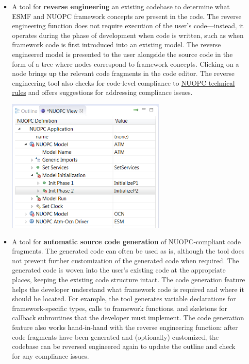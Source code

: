 \documentclass[oneside,11pt]{memoir}
\begin{document}
\begin{itemize}


\item
A tool for \textbf{reverse engineering} an existing codebase to determine what ESMF and NUOPC framework concepts are present in the code. The reverse engineering function does not require execution of the user's code---instead, it operates during the phase of development when code is written, such as when framework code is first introduced into an existing model. The reverse engineered model is presented to the user alongside the source code in the form of a tree where nodes correspond to framework concepts. Clicking on a node brings up the relevant code fragments in the code editor. The reverse engineering tool also checks for code-level compliance to \href{https://earthsystemcog.org/projects/nuopc/esmf2nuopc}{NUOPC technical rules} and offers suggestions for addressing compliance issues.

\parbox{\linewidth}{\centering
  \includegraphics[width=8cm]{figs/feature_reveng.png}
}
\vspace{24pt}

\item A tool for \textbf{automatic source code generation} of NUOPC-compliant code fragments. The generated code can often be used as is, although the tool does not prevent further customization of the generated code when required. The generated code is woven into the user's existing code at the appropriate places, keeping the existing code structure intact. The code generation feature helps the developer understand what framework code is required and where it should be located. For example, the tool generates variable declarations for framework-specific types, calls to framework functions, and skeletons for callback subroutines that the developer must implement. The code generation feature also works hand-in-hand with the reverse engineering function: after code fragments have been generated and (optionally) customized, the codebase can be reversed engineered again to update the outline and check for any compliance issues.


\end{itemize}
\end{document}
